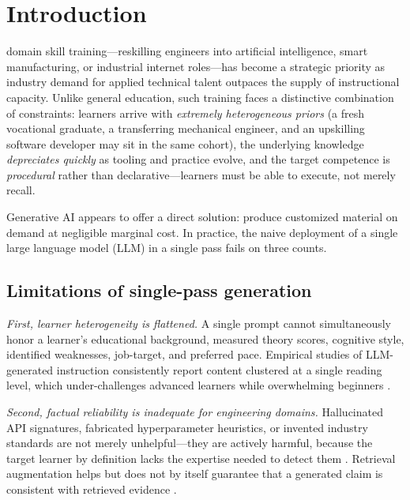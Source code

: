 \section{Introduction}
\label{sec:intro}

 domain skill training---reskilling engineers into
artificial intelligence, smart manufacturing, or industrial internet
roles---has become a strategic priority as industry demand for applied
technical talent outpaces the supply of instructional capacity. Unlike
general education, such training faces a distinctive combination of
constraints: learners arrive with \emph{extremely heterogeneous priors} (a
fresh vocational graduate, a transferring mechanical engineer, and an
upskilling software developer may sit in the same cohort), the underlying
knowledge \emph{depreciates quickly} as tooling and practice evolve, and the
target competence is \emph{procedural} rather than declarative---learners must
be able to execute, not merely recall.

Generative AI appears to offer a direct solution: produce customized material
on demand at negligible marginal cost. In practice, the naive deployment of a
single large language model (LLM) in a single pass fails on three counts.

\subsection{Limitations of single-pass generation}

\emph{First, learner heterogeneity is flattened.} A single prompt cannot
simultaneously honor a learner's educational background, measured theory
scores, cognitive style, identified weaknesses, job-target, and preferred
pace. Empirical studies of LLM-generated instruction consistently report
content clustered at a single reading level, which under-challenges advanced
learners while overwhelming beginners
\cite{kasneci2023chatgpt,baidoo2023education}.

\emph{Second, factual reliability is inadequate for engineering domains.}
Hallucinated API signatures, fabricated hyperparameter heuristics, or
invented industry standards are not merely unhelpful---they are actively
harmful, because the target learner by definition lacks the expertise needed
to detect them \cite{ji2023survey,huang2023survey}. Retrieval augmentation
helps but does not by itself guarantee that a generated claim is consistent
with retrieved evidence \cite{gao2023retrieval}.

